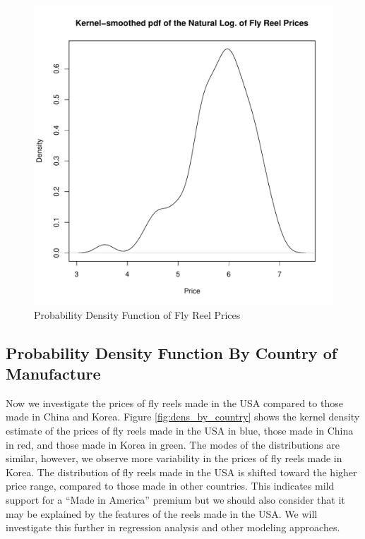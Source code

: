 \documentclass[11pt]{book}
\begin{document}
\begin{figure}[h!]
  \centering
  \includegraphics[scale = 0.5, keepaspectratio=true]{../Figures/density_prices}
  \caption{Probability Density Function of Fly Reel Prices} \label{fig:density_prices}
\end{figure}






\clearpage
\pagebreak
\subsection{Probability Density Function By Country of Manufacture}

Now we investigate the prices of fly reels made in the USA
compared to those made in China and Korea.
Figure \ref{fig:dens_by_country} shows the 
kernel density estimate of the prices of 
fly reels made in the USA in blue,
those made in China in red, 
and those made in Korea in green.
% 
The modes of the distributions are similar, 
however, we observe more variability in the prices of fly reels
made in Korea. 
The distribution of fly reels made in the USA is shifted 
toward the higher price range, compared to those made in other countries.
This indicates mild support for a ``Made in America'' premium
but we should also consider that it may be explained by 
the features of the reels made in the USA. 
We will investigate this further in regression analysis 
and other modeling approaches. 
\end{document}
